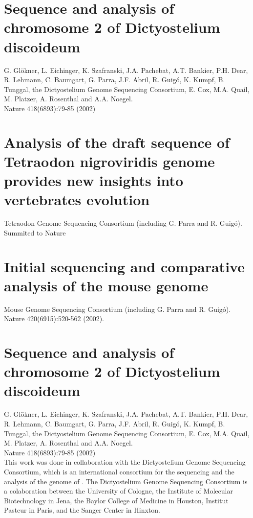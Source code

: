 \section*{Sequence and analysis of chromosome 2 of Dictyostelium discoideum}
G. Gl\"okner, L. Eichinger, K. Szafranski, J.A. Pachebat,
A.T. Bankier, P.H. Dear, R. Lehmann, C. Baumgart, G. Parra,
J.F. Abril, R. Guig\'o, K. Kumpf, B. Tunggal, the Dictyostelium Genome
Sequencing Consortium, E. Cox, M.A. Quail, M. Platzer, A. Rosenthal
and A.A. Noegel.\\
Nature 418(6893):79-85 (2002)\\

\section*{Analysis of the draft sequence of Tetraodon nigroviridis genome
provides new insights into vertebrates evolution}
Tetraodon Genome Sequencing Consortium (including G. Parra and R. Guig\'o). \\
Summited to Nature\\

\section*{Initial sequencing and comparative analysis of the mouse genome}
Mouse Genome Sequencing Consortium (including G. Parra and R. Guig\'o).\\
Nature 420(6915):520-562 (2002). \\


\clearemptydoublepage

\section*{Sequence and analysis of chromosome 2 of Dictyostelium discoideum}
G. Gl\"okner, L. Eichinger, K. Szafranski, J.A. Pachebat,
A.T. Bankier, P.H. Dear, R. Lehmann, C. Baumgart, G. Parra,
J.F. Abril, R. Guig\'o, K. Kumpf, B. Tunggal, the Dictyostelium Genome
Sequencing Consortium, E. Cox, M.A. Quail, M. Platzer, A. Rosenthal
and A.A. Noegel.\\
Nature 418(6893):79-85 (2002)\\


This work was done in collaboration with the Dictyostelium Genome
Sequencing Consortium, which is an international consortium for the
sequencing and the analysis of the genome of \Dd. The Dictyostelium
Genome Sequencing Consortium is a colaboration between the University
of Cologne, the Institute of Molecular Biotechnology in Jena, the
Baylor College of Medicine in Houston, Institut Pasteur in Paris, and
the Sanger Center in Hinxton.

